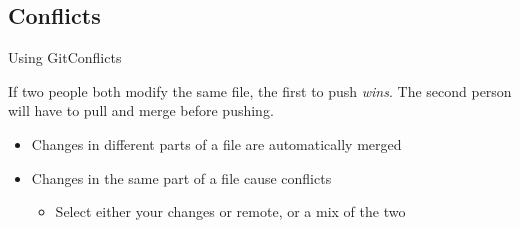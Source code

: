 \documentclass[10pt,compress]{beamer} %
\begin{document}










\subsection{Conflicts}
\begin{frame}{Using Git}{Conflicts}

If two people both modify the same file, the first to push \emph{wins}.
The second person will have to pull and merge before pushing.

\begin{itemize}
	\item Changes in different parts of a file are automatically merged
	\item Changes in the same part of a file cause conflicts
	\begin{itemize}
		\item Select either your changes or remote, or a mix of the two
	\end{itemize}
\end{itemize}
\end{frame}




\end{document}
